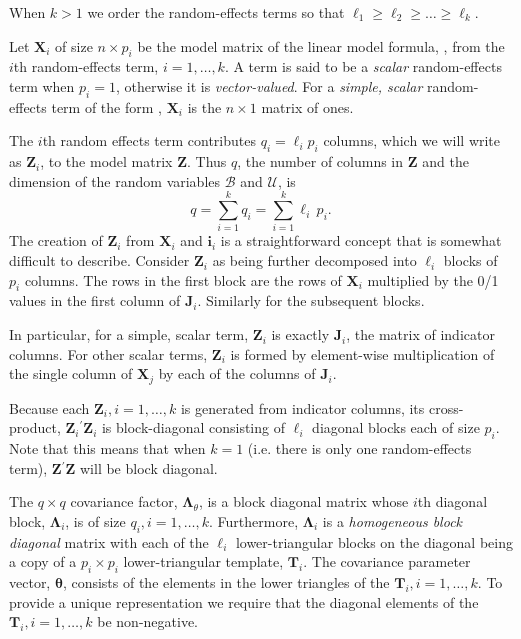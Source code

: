 \documentclass{jss}
\newcommand{\bLt}{\ensuremath{\bm\Lambda_\theta}}
\newcommand{\mc}[1]{\ensuremath{\mathcal{#1}}}
\newcommand{\trans}{\ensuremath{^\prime}}
\begin{document}
When $k>1$ we order the random-effects terms so that
$\ell_1\ge\ell_2\ge\dots\ge\ell_k$.

Let $\bm X_i$ of size $n\times p_i$ be the model matrix of the linear
model formula, , from the $i$th random-effects term,
$i=1,\dots,k$.  A term is said to be a \emph{scalar} random-effects
term when $p_i=1$, otherwise it is \emph{vector-valued}.  For a
\emph{simple, scalar} random-effects term of the form ,
$\bm X_i$ is the $n\times 1$ matrix of ones.

The $i$th random effects term contributes $q_i=\ell_ip_i$ columns,
which we will write as $\bm Z_i$, to
the model matrix $\bm Z$.  Thus $q$, the number of columns in $\bm Z$
and the dimension of the random variables $\mc{B}$ and $\mc{U}$, is%
  \begin{equation}
    \label{eq:qcalc}
    q=\sum_{i=1}^k q_i = \sum_{i=1}^k \ell_i\,p_i .
  \end{equation}%
The creation of $\bm Z_i$ from $\bm X_i$ and $\bm i_i$ is a
straightforward concept that is somewhat difficult to describe.
Consider $\bm Z_i$ as being further decomposed into $\ell_i$ blocks of
$p_i$ columns.  The rows in the first block are the rows of $\bm X_i$
multiplied by the 0/1 values in the first column of $\bm J_i$.
Similarly for the subsequent blocks.

In particular, for a simple, scalar term, $\bm Z_i$ is exactly $\bm
J_i$, the matrix of indicator columns.  For other scalar terms, $\bm
Z_i$ is formed by element-wise multiplication of the single column of
$\bm X_j$ by each of the columns of $\bm J_i$.

Because each $\bm Z_i,i=1,\dots,k$ is generated from indicator
columns, its cross-product, $\bm Z_i\trans\bm Z_i$ is block-diagonal
consisting of $\ell_i$ diagonal blocks each of size $p_i$.
Note that this means that when $k=1$ (i.e. there is only one
random-effects term), $\bm Z\trans\bm Z$ will be block diagonal.

The $q\times q$ covariance factor, $\bLt$, is a block diagonal matrix
whose $i$th diagonal block, $\bm\Lambda_i$, is of size
$q_i,i=1,\dots,k$.  Furthermore, $\bm\Lambda_i$ is a \emph{homogeneous
  block diagonal} matrix with each of the $\ell_i$ lower-triangular
blocks on the diagonal being a copy of a $p_i\times p_i$ lower-triangular
template, $\bm T_i$.  The covariance parameter vector, $\bm\theta$,
consists of the elements in the lower triangles of the $\bm
T_i,i=1,\dots,k$.  To provide a unique representation we require that
the diagonal elements of the $\bm T_i,i=1,\dots,k$ be non-negative.
\end{document}
